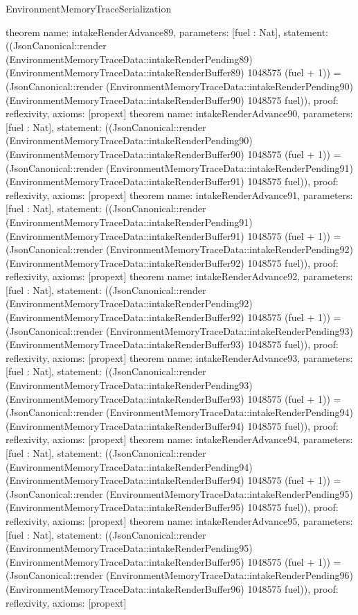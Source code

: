 \begin{lexlean}{EnvironmentMemoryTraceSerialization}
\begin{semanticmodule}
{}
theorem{
 name: intakeRenderAdvance89, parameters: [fuel : Nat],
 statement: ((JsonCanonical::render (EnvironmentMemoryTraceData::intakeRenderPending89) (EnvironmentMemoryTraceData::intakeRenderBuffer89) 1048575 (fuel + 1)) = (JsonCanonical::render (EnvironmentMemoryTraceData::intakeRenderPending90) (EnvironmentMemoryTraceData::intakeRenderBuffer90) 1048575 fuel)), proof: reflexivity{}, axioms: [propext]
}
theorem{
 name: intakeRenderAdvance90, parameters: [fuel : Nat],
 statement: ((JsonCanonical::render (EnvironmentMemoryTraceData::intakeRenderPending90) (EnvironmentMemoryTraceData::intakeRenderBuffer90) 1048575 (fuel + 1)) = (JsonCanonical::render (EnvironmentMemoryTraceData::intakeRenderPending91) (EnvironmentMemoryTraceData::intakeRenderBuffer91) 1048575 fuel)), proof: reflexivity{}, axioms: [propext]
}
theorem{
 name: intakeRenderAdvance91, parameters: [fuel : Nat],
 statement: ((JsonCanonical::render (EnvironmentMemoryTraceData::intakeRenderPending91) (EnvironmentMemoryTraceData::intakeRenderBuffer91) 1048575 (fuel + 1)) = (JsonCanonical::render (EnvironmentMemoryTraceData::intakeRenderPending92) (EnvironmentMemoryTraceData::intakeRenderBuffer92) 1048575 fuel)), proof: reflexivity{}, axioms: [propext]
}
theorem{
 name: intakeRenderAdvance92, parameters: [fuel : Nat],
 statement: ((JsonCanonical::render (EnvironmentMemoryTraceData::intakeRenderPending92) (EnvironmentMemoryTraceData::intakeRenderBuffer92) 1048575 (fuel + 1)) = (JsonCanonical::render (EnvironmentMemoryTraceData::intakeRenderPending93) (EnvironmentMemoryTraceData::intakeRenderBuffer93) 1048575 fuel)), proof: reflexivity{}, axioms: [propext]
}
theorem{
 name: intakeRenderAdvance93, parameters: [fuel : Nat],
 statement: ((JsonCanonical::render (EnvironmentMemoryTraceData::intakeRenderPending93) (EnvironmentMemoryTraceData::intakeRenderBuffer93) 1048575 (fuel + 1)) = (JsonCanonical::render (EnvironmentMemoryTraceData::intakeRenderPending94) (EnvironmentMemoryTraceData::intakeRenderBuffer94) 1048575 fuel)), proof: reflexivity{}, axioms: [propext]
}
theorem{
 name: intakeRenderAdvance94, parameters: [fuel : Nat],
 statement: ((JsonCanonical::render (EnvironmentMemoryTraceData::intakeRenderPending94) (EnvironmentMemoryTraceData::intakeRenderBuffer94) 1048575 (fuel + 1)) = (JsonCanonical::render (EnvironmentMemoryTraceData::intakeRenderPending95) (EnvironmentMemoryTraceData::intakeRenderBuffer95) 1048575 fuel)), proof: reflexivity{}, axioms: [propext]
}
theorem{
 name: intakeRenderAdvance95, parameters: [fuel : Nat],
 statement: ((JsonCanonical::render (EnvironmentMemoryTraceData::intakeRenderPending95) (EnvironmentMemoryTraceData::intakeRenderBuffer95) 1048575 (fuel + 1)) = (JsonCanonical::render (EnvironmentMemoryTraceData::intakeRenderPending96) (EnvironmentMemoryTraceData::intakeRenderBuffer96) 1048575 fuel)), proof: reflexivity{}, axioms: [propext]
}
\end{semanticmodule}
\end{lexlean}
